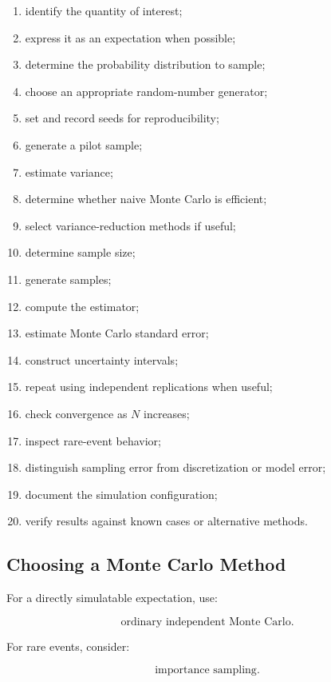 \begin{enumerate}
    \item identify the quantity of interest;
    \item express it as an expectation when possible;
    \item determine the probability distribution to sample;
    \item choose an appropriate random-number generator;
    \item set and record seeds for reproducibility;
    \item generate a pilot sample;
    \item estimate variance;
    \item determine whether naive Monte Carlo is efficient;
    \item select variance-reduction methods if useful;
    \item determine sample size;
    \item generate samples;
    \item compute the estimator;
    \item estimate Monte Carlo standard error;
    \item construct uncertainty intervals;
    \item repeat using independent replications when useful;
    \item check convergence as \(N\) increases;
    \item inspect rare-event behavior;
    \item distinguish sampling error from discretization or model error;
    \item document the simulation configuration;
    \item verify results against known cases or alternative methods.
\end{enumerate}

\subsection{Choosing a Monte Carlo Method}
\label{subsec:choosing-monte-carlo-method}

For a directly simulatable expectation, use:

\[
\boxed{
\text{ordinary independent Monte Carlo}.
}
\]

For rare events, consider:

\[
\boxed{
\text{importance sampling}.
}
\]

